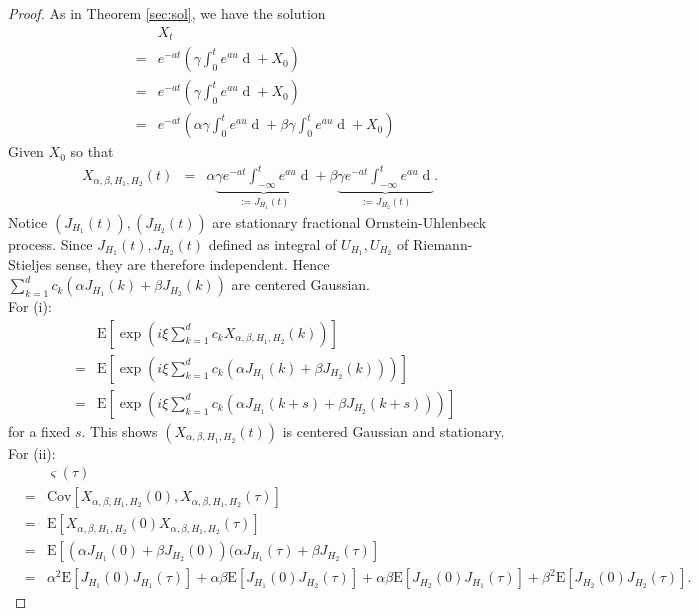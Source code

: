 \documentclass[a4paper, twoside, 11pt]{article}
\theoremstyle{definition}
\newcommand{\brkt}[1]{\left({#1} \right)}
\begin{document}
\begin{proof}
As in Theorem \ref{sec:sol}, we have the solution
\begin{eqnarray*}
  &&X_t\\ 
  &=& e^{-at} \brkt{\gamma\int_0^t e^{au} \mathop{dM_{\alpha,\beta,H_1,H_2}} + X_0}\\
  &=&  e^{-at} \brkt{\gamma\int_0^t e^{au} \mathop{d(\alpha U_{H_1} + \beta U_{H_2})} + X_0}\\
  &=&  e^{-at} \brkt{\alpha \gamma\int_0^t e^{au} \mathop{d U_{H_1}} + \beta \gamma\int_0^t e^{au} \mathop{d U_{H_2}} + X_0}
\end{eqnarray*}
Given $X_0$ so that
\begin{eqnarray}
  X_{\alpha,\beta,H_1,H_2}(t) &=&  \alpha \underbrace{\gamma e^{-at}\int_{-\infty}^t e^{au} \mathop{d U_{H_1}}}_{:=J_{H_1}(t)} + \beta\underbrace{ \gamma e^{-at}\int_{-\infty}^t e^{au} \mathop{d U_{H_2}}}_{:=J_{H_2}(t)}.
  \label{sec:jjj}
\end{eqnarray}
Notice $(J_{H_1}(t)), (J_{H_2}(t))$ are stationary fractional Ornstein-Uhlenbeck process. Since $J_{H_1}(t), J_{H_2}(t)$ defined as integral of $U_{H_1}, U_{H_2}$ of Riemann-Stieljes sense, they are therefore independent.  Hence  $\sum\limits_{k=1}^{d} c_k (\alpha J_{H_1}(k) + \beta J_{H_2}(k))$ are centered Gaussian.\\
For (i): 
 \begin{eqnarray*}
   &&\mathrm{E}[\exp(i\xi\sum\limits_{k=1}^{d} c_k X_{\alpha,\beta,H_1,H_2}(k))]\\
   &=& \mathrm{E}[\exp(i\xi\sum\limits_{k=1}^{d} c_k (\alpha J_{H_1}(k) + \beta J_{H_2}(k)))]\\
   &=& \mathrm{E}[\exp(i\xi\sum\limits_{k=1}^{d} c_k (\alpha J_{H_1}(k+s) + \beta J_{H_2}(k+s)))]
  \end{eqnarray*}
  for a fixed $s$. This shows $(X_{\alpha,\beta,H_1,H_2}(t))$ is centered Gaussian and stationary.\\
  For (ii): 
  \begin{eqnarray*}
	&&\varsigma(\tau) \\
	&=& \mathrm{Cov}[X_{\alpha,\beta,H_1,H_2}(0),X_{\alpha,\beta,H_1,H_2}(\tau)]\\
	&=& \mathrm{E}[X_{\alpha,\beta,H_1,H_2}(0)X_{\alpha,\beta,H_1,H_2}(\tau)]\\
	&=& \mathrm{E}[(\alpha J_{H_1}(0) + \beta J_{H_2}(0))(\alpha J_{H_1}(\tau) + \beta J_{H_2}(\tau)]\\
	&=& \alpha^2\mathrm{E}[J_{H_1}(0) J_{H_1}(\tau)] + \alpha\beta\mathrm{E}[J_{H_1}(0)J_{H_2}(\tau)] + \alpha\beta\mathrm{E}[J_{H_2}(0)J_{H_1}(\tau)] + \beta^2\mathrm{E}[J_{H_2}(0)J_{H_2}(\tau)].

\end{eqnarray*}
\end{proof}
\end{document}
